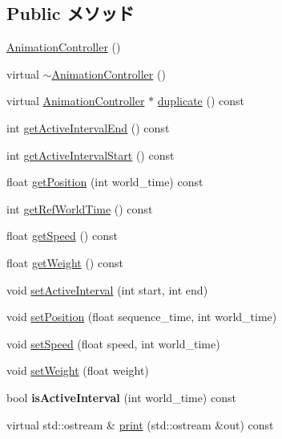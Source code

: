 \subsection*{Public メソッド}
\begin{CompactItemize}
\item 
\hyperlink{classm3g_1_1AnimationController_f2e8cb2c6c916983d0f87140c7b0c98e}{AnimationController} ()
\item 
virtual \hyperlink{classm3g_1_1AnimationController_346849d0f82278f30dda9f35f80e9dbe}{$\sim$AnimationController} ()
\item 
virtual \hyperlink{classm3g_1_1AnimationController}{AnimationController} $\ast$ \hyperlink{classm3g_1_1AnimationController_aab6521891038ced0961ecb78611646e}{duplicate} () const 
\item 
int \hyperlink{classm3g_1_1AnimationController_7caa95c7ed5a03844abe328feaae4911}{getActiveIntervalEnd} () const 
\item 
int \hyperlink{classm3g_1_1AnimationController_c66e837ae4152477eabdfcbe7fb21adb}{getActiveIntervalStart} () const 
\item 
float \hyperlink{classm3g_1_1AnimationController_dfdea73153cb34c26979575efda149e2}{getPosition} (int world\_\-time) const 
\item 
int \hyperlink{classm3g_1_1AnimationController_103e1bd81eba2cc90f31e7fdc4f3c601}{getRefWorldTime} () const 
\item 
float \hyperlink{classm3g_1_1AnimationController_4ab87c5df7c3eadd17b318a426773fcb}{getSpeed} () const 
\item 
float \hyperlink{classm3g_1_1AnimationController_a17d38dafd3d75c59f0609f037fbe5ae}{getWeight} () const 
\item 
void \hyperlink{classm3g_1_1AnimationController_a4cba877288d7a188477e0a756fd2f58}{setActiveInterval} (int start, int end)
\item 
void \hyperlink{classm3g_1_1AnimationController_da0d7a404b2a75ee182ca6351cf673d5}{setPosition} (float sequence\_\-time, int world\_\-time)
\item 
void \hyperlink{classm3g_1_1AnimationController_b32791d1a51df9ac8028792a841d06a6}{setSpeed} (float speed, int world\_\-time)
\item 
void \hyperlink{classm3g_1_1AnimationController_8859df4d5a61714012bf9e1240189aed}{setWeight} (float weight)
\item 
\hypertarget{classm3g_1_1AnimationController_8db30a5f125f5b22a1cde9e41d93c2f0}{
bool \textbf{isActiveInterval} (int world\_\-time) const }
\label{classm3g_1_1AnimationController_8db30a5f125f5b22a1cde9e41d93c2f0}

\item 
virtual std::ostream \& \hyperlink{classm3g_1_1AnimationController_6fea17fa1532df3794f8cb39cb4f911f}{print} (std::ostream \&out) const 
\end{CompactItemize}


